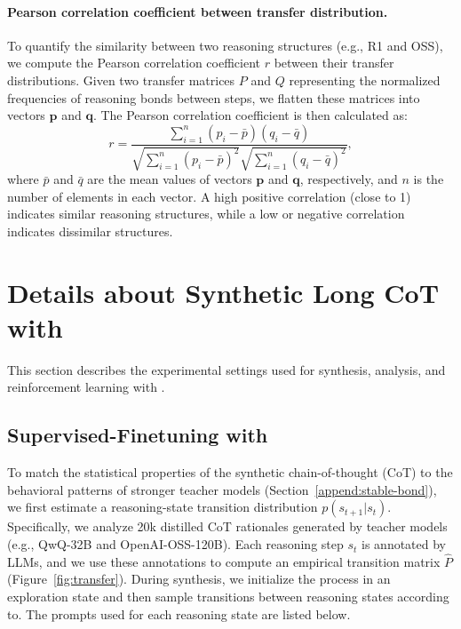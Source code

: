 \paragraph{\textbf{Pearson correlation coefficient
between transfer distribution.}}
To quantify the similarity between two reasoning structures (e.g., R1 and OSS), we compute the Pearson correlation coefficient \(r\) between their transfer distributions. Given two transfer matrices \(P\) and \(Q\) representing the normalized frequencies of reasoning bonds between steps, we flatten these matrices into vectors \(\mathbf{p}\) and \(\mathbf{q}\). The Pearson correlation coefficient is then calculated as:
\begin{equation}
r = \frac{\sum_{i=1}^{n} (p_i - \bar{p})(q_i - \bar{q})}{\sqrt{\sum_{i=1}^{n} (p_i - \bar{p})^2} \sqrt{\sum_{i=1}^{n} (q_i - \bar{q})^2}},
\end{equation}
where \(\bar{p}\) and \(\bar{q}\) are the mean values of vectors \(\mathbf{p}\) and \(\mathbf{q}\), respectively, and \(n\) is the number of elements in each vector. A high positive correlation (close to 1) indicates similar reasoning structures, while a low or negative correlation indicates dissimilar structures.




\section{Details about Synthetic Long CoT with \method}
\label{app:settings}


This section describes the experimental settings used for synthesis, analysis, and reinforcement learning with \method.
\subsection{Supervised-Finetuning with \method}
To match the statistical properties of the synthetic chain-of-thought (CoT) to the behavioral patterns of stronger teacher models (Section~\ref{append:stable-bond}), we first estimate a reasoning-state transition distribution \(p(s_{t+1}|s_t)\). Specifically, we analyze 20k distilled CoT rationales generated by teacher models (e.g., QwQ-32B and OpenAI-OSS-120B). Each reasoning step \(s_t\) is annotated by LLMs, and we use these annotations to compute an empirical transition matrix \(\hat{P}\) (Figure~\ref{fig:transfer}). During synthesis, we initialize the process in an exploration state and then sample transitions between reasoning states according to. The prompts used for each reasoning state are listed below.

